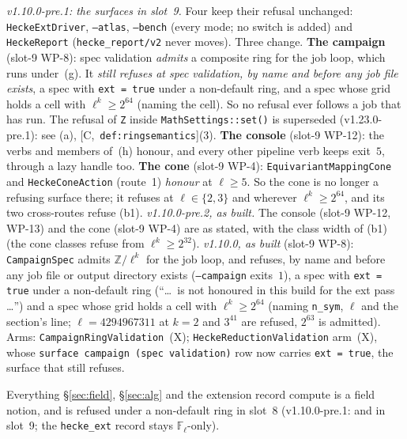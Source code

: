 \documentclass[11pt]{article}
\theoremstyle{remark}
\newcommand{\F}{\mathbb{F}}
\newcommand{\Z}{\mathbb{Z}}
\newcommand{\Fl}{\F_\ell}
\newcommand{\HA}[1]{[C,~\texttt{#1}]}      %
\begin{document}
\begin{enumerate}[label=(b\arabic*)]
  \begingroup\sloppy\emph{v1.10.0-pre.1: the surfaces in slot~9.} Four keep their refusal unchanged:
  \texttt{HeckeExtDriver}, \texttt{--atlas}, \texttt{--bench} (every mode; no switch is added)
  and \texttt{HeckeReport} (\texttt{hecke\_report/v2} never moves). Three change.
  \textbf{The campaign} (slot-9 WP-8): spec validation \emph{admits} a composite ring for the job
  loop, which runs under~(g). It \emph{still refuses at spec validation, by name and before any
  job file exists}, a spec with \texttt{ext = true} under a non-default ring, and a spec whose
  grid holds a cell with $\ell^k\ge2^{64}$ (naming the cell). So no refusal ever follows a job
  that has run. The refusal of \texttt{Z} inside \texttt{MathSettings::set()} is superseded (v1.23.0-pre.1): see (a), \HA{def:ringsemantics}(3).
  \textbf{The console} (slot-9 WP-12): the verbs and members of~(h) honour, and every other
  pipeline verb keeps exit~$5$, through a lazy handle too. \textbf{The cone}
  (slot-9 WP-4): \texttt{EquivariantMappingCone} and \texttt{HeckeConeAction} (route~1)
  \emph{honour} at $\ell\ge5$. So the cone is no longer a refusing surface there; it refuses at
  $\ell\in\{2,3\}$ and wherever $\ell^k\ge2^{64}$, and its two cross-routes refuse (b1).
  \emph{v1.10.0-pre.2, as built.} The console (slot-9 WP-12, WP-13) and the cone (slot-9 WP-4)
  are as stated, with the class width of (b1) (the cone classes refuse from $\ell^k\ge2^{32}$).
  \emph{v1.10.0, as built} (slot-9 WP-8): \texttt{CampaignSpec} admits $\Z/\ell^k$ for the job
  loop, and refuses, by name and before any job file or output directory exists
  (\texttt{--campaign} exits~$1$), a spec with \texttt{ext = true} under a non-default ring
  (``\ldots\ is not honoured in this build for the ext pass \ldots'') and a spec whose grid holds a
  cell with $\ell^k\ge2^{64}$ (naming \texttt{n\_sym}, $\ell$ and the section's line; $\ell=4294967311$
  at $k=2$ and $3^{41}$ are refused, $2^{63}$ is admitted). Arms: \texttt{CampaignRingValidation}~(X);
  \texttt{HeckeReductionValidation} arm~(X), whose \texttt{surface campaign (spec validation)} row
  now carries \texttt{ext = true}, the surface that still refuses.\par\endgroup
\end{enumerate}
Everything \S\ref{sec:field}, \S\ref{sec:alg} and the extension record compute is a field notion,
and is refused under a non-default ring in slot~8 (v1.10.0-pre.1: and in slot~9; the
\texttt{hecke\_ext} record stays $\Fl$-only).
\end{document}
